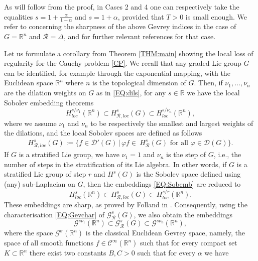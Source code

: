 \documentclass[12pt,oneside,a4paper]{book}
\numberwithin{equation}{section}     %
\theoremstyle{plain}
\theoremstyle{definition}
\newcommand{\R}{{\mathbb R}}
\newcommand{\Rn}{{\R}^n}
\begin{document}
As will follow from the proof, in Cases 2 and 4 one can respectively take the equalities $s=1 +\frac{\alpha}{1-\alpha}$ and $s=1 +\alpha$, provided that $T>0$ is small enough.
We refer to \cite{GR2012, GR2013} concerning the sharpness of the above Gevrey indices in the case of $G=\Rn$ and $\mathcal R=\Delta$, and for further relevant references for that case.

Let us formulate a corollary from Theorem \ref{THM:main} showing the local loss of regularity for the Cauchy problem \eqref{CP}. We recall that any graded Lie group $G$ can be identified, for example through the exponential mapping, with the Euclidean space $\Rn$ where $n$ is the topological dimension of $G$. Then, if $\nu_1,\ldots,\nu_n$ are the dilation weights on $G$ as in \eqref{EQ:dils}, for any $s\in\R$ we have the local Sobolev embedding theorems \cite[Theorem 4.4.24]{FR2016}
\begin{equation}\label{EQ:Sobemb}
H^{s/\nu_1}_{loc}(\Rn)\subset H^s_{\mathcal R, loc}(G)\subset H^{s/\nu_n}_{loc}(\Rn),
\end{equation} 
where we assume $\nu_1$ and $\nu_n$ to be respectively the smallest and largest weights of the dilations, and the local Sobolev spaces are defined as follows
\begin{align*}
H^s_{\mathcal R, loc}(G):=\big\{f\in\mathcal{D}'(G)\,\big|\,\varphi f\in\ H^s_{\mathcal{R}}(G)\text{ for all }\varphi\in\mathcal{D}(G)\big\}.
\end{align*}
If $G$ is a stratified Lie group, we have $\nu_1=1$ and $\nu_n$ is the step of $G$, i.e., the number of steps in the stratification of its Lie algebra. In other words, if $G$ is a stratified Lie group of step $r$ and $H^s(G)$ is the Sobolev space defined using (any) sub-Laplacian on $G$, then the embeddings \eqref{EQ:Sobemb} are reduced to
\begin{equation}\label{EQ:Sobembs}
H^{s}_{loc}(\Rn)\subset H^s_{\mathcal R, loc}(G)\subset H^{s/r}_{loc}(\Rn).
\end{equation} 
These embeddings are sharp, as proved by Folland in \cite[Theorem 4.16]{F75}. Consequently, using the characterisation \eqref{EQ:Gevchar} of $\mathcal G^s_{\mathcal R}(G)$, we also obtain the embeddings 
\begin{equation}\label{EQ:Gevemb}
\mathcal G^{s \nu_1}(\Rn)\subset \mathcal G^s_{\mathcal R}(G)\subset \mathcal G^{s\nu_n}(\Rn),
\end{equation} 
where the space $\mathcal G^{\sigma}(\Rn)$ is the classical Euclidean Gevrey space, namely, the space of all smooth functions $f\in \mathcal C^\infty(\Rn)$ such that for every compact set $K\subset\Rn$ there exist two constants $B,C>0$ such that for every $\alpha$ we have
\end{document}
